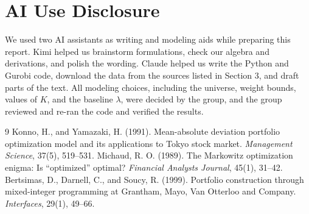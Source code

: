 \documentclass[11pt]{article}
\begin{document}
\section*{AI Use Disclosure}
We used two AI assistants as writing and modeling aids while preparing this report. Kimi helped us brainstorm formulations, check our algebra and derivations, and polish the wording. Claude helped us write the Python and Gurobi code, download the data from the sources listed in Section 3, and draft parts of the text. All modeling choices, including the universe, weight bounds, values of $K$, and the baseline $\lambda$, were decided by the group, and the group reviewed and re-ran the code and verified the results.

\begin{thebibliography}{9}\small
{} Konno, H., and Yamazaki, H. (1991). Mean-absolute deviation portfolio optimization model and its applications to Tokyo stock market. \emph{Management Science}, 37(5), 519--531.
 Michaud, R. O. (1989). The Markowitz optimization enigma: Is ``optimized'' optimal? \emph{Financial Analysts Journal}, 45(1), 31--42.
 Bertsimas, D., Darnell, C., and Soucy, R. (1999). Portfolio construction through mixed-integer programming at Grantham, Mayo, Van Otterloo and Company. \emph{Interfaces}, 29(1), 49--66.
\end{thebibliography}
\end{document}
